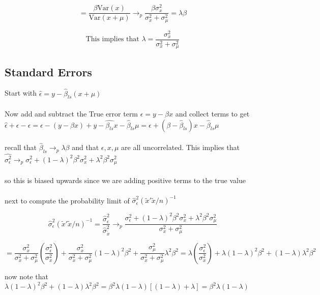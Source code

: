 \documentclass[11pt]{article}
\newcommand{\Var}{\mathrm{Var}}
\newcommand{\plim}{\rightarrow_{p}}
\begin{document}
 $$ = \frac{\beta \Var(x) }{\Var(x + \mu)} \rightarrow_{p} \frac{\beta \sigma_{x}^2}{\sigma_{x}^2 + \sigma_{\mu}^2} = \lambda \beta$$
 
 $$\text{This implies that } \lambda = \frac{\sigma_{x}^2}{\sigma_{x}^2 + \sigma_{\mu}^2} $$
 
\subsection{Standard Errors}

Start with $ \hat{\epsilon} = y - \hat{\beta}_{ls}(x + \mu) $ \\
\\
 Now add and subtract the True error term $\epsilon = y - \beta x$ and collect terms to get $ \hat{\epsilon} + \epsilon - \epsilon = \epsilon - (y - \beta x) + y - \hat{\beta_{ls}} x - \hat{\beta}_{ls}\mu = \epsilon + (\beta - \hat{\beta}_{ls})x - \hat{\beta}_{ls} \mu$
 \\ \\
 recall that $\hat{\beta}_{ls} \rightarrow_{p} \lambda \beta $ and that $ \epsilon, x, \mu$ are all uncorrelated. This implies that $\hat{\sigma_{\epsilon}^2} \plim \sigma_{\epsilon}^2 + (1-\lambda)^2 \beta^2\sigma_{x}^2 + \lambda^2 \beta^2 \sigma_{\mu}^2$
 \\ \\ 
 so this is biased upwards since we are adding positive terms to the true value 
 \\ \\ 
 next to compute the probability limit of $\hat{\sigma}_{\epsilon}^2 (\tilde{x}'\tilde{x}/n)^{-1}$
 
 $$ \hat{\sigma}_{\epsilon}^2 (\tilde{x}'\tilde{x}/n)^{-1} = \frac{\hat{\sigma}_{\epsilon}^2}{\hat{\sigma}_{\tilde{x}}^2} \plim \frac{ \sigma_{\epsilon}^2 + (1-\lambda)^2 \beta^2\sigma_{x}^2 + \lambda^2 \beta^2 \sigma_{\mu}^2}{\sigma_{x}^2 + \sigma_{\mu}^2}$$
 
$$ =\frac{\sigma_{x}^2}{\sigma_{x}^2 + \sigma_{\mu}^2}(\frac{\sigma_{\epsilon}^2}{\sigma_{x}^2}) + \frac{\sigma_{x}^2}{\sigma_{x}^2 + \sigma_{\mu}^2}(1-\lambda)^2 \beta^2 + \frac{\sigma_{\mu}^2}{\sigma_{x}^2 + \sigma_{\mu}^2} \lambda^2 \beta^2  = \lambda(\frac{\sigma_{\epsilon}^2}{\sigma_{x}^2}) + \lambda (1-\lambda)^2 \beta^2 + (1-\lambda) \lambda^2 \beta^2  $$

now note that $  \lambda (1-\lambda)^2 \beta^2 + (1-\lambda) \lambda^2 \beta^2 = \beta^2\lambda (1-\lambda)[(1-\lambda) + \lambda] = \beta^2 \lambda (1-\lambda)$
\end{document}
